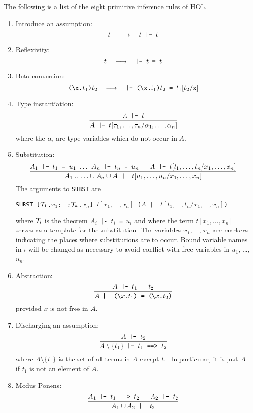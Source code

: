 The following is a list of the eight primitive inference rules of HOL.
\begin{enumerate}
\item Introduce an assumption:
$$ t \quad \longrightarrow \quad \mbox{\tt $t$ |- $t$} $$

\item Reflexivity:
$$ t \quad \longrightarrow \quad \mbox{\tt |- $t$ = $t$}$$

\item Beta-conversion:
$$ \mbox{\tt ({\l}x.$t_1$)$t_2$} \quad \longrightarrow \quad
  \mbox{\tt |- ({\l}x.$t_1$)$t_2$ = $t_1[t_2/{\tt x}]$} $$

\item Type instantiation:
$$\frac{\mbox{\tt $A$ |- $t$}}{\mbox{\tt $A$ |- $t[\tau_1,\ldots,\tau_n/
\alpha_1,\ldots,\alpha_n]$}}$$
where the $\alpha_i$ are type variables which do not occur in $A$.

\item Substitution:
$$\frac{\mbox{\tt $A_1$ |- $t_1$ = $u_1$ $\ldots$ $A_n$ |- $t_n$ = $u_n$ \quad
 $A$ |- $t[t_1,\ldots,t_n/x_1,\ldots,x_n]$}}{\mbox{\tt $A_1\cup\ldots\cup A_n
  \cup A$ |- $t[u_1,\ldots,u_n/x_1,\ldots,x_n]$}}$$
The arguments to {\tt SUBST} are 
\begin{center}\tt SUBST [${\cal T}_1$,$x_1$;$\ldots$;${\cal T}_n$,$x_n$]
 $t[x_1,\ldots,x_n]$ ($A$ |- $t[t_1,\ldots,t_n/x_1,\ldots,x_n]$)
\end{center}
where ${\cal T}_i$ is the theorem {\tt $A_i$ |- $t_i$ = $u_i$} and where the
term $t[x_1,\ldots,x_n]$ serves as a template for the substitution.  The
variables $x_1$, \ldots, $x_n$ are markers indicating the places where
substitutions are to occur.  Bound variable names in $t$ will be changed as
necessary to avoid conflict with free variables in $u_1$, \ldots, $u_n$.

\item Abstraction:
$$\frac{\mbox{\tt $A$ |- $t_1$ = $t_2$}}{\mbox{\tt $A$ |- ({\l}$x$.$t_1$) =
({\l}$x$.$t_2$)}}$$
provided $x$ is not free in $A$.

\item Discharging an assumption:
$$\frac{\mbox{\tt $A$ |- $t_2$}}{\mbox{\tt $A\setminus\{t_1\}$ |- $t_1$ ==>
$t_2$}}$$
where $A\setminus\{t_1\}$ is the set of all terms in $A$ except $t_1$.  In
particular, it is just $A$ if $t_1$ is not an element of $A$.

\item Modus Ponens:
$$\frac{\mbox{\tt $A_1$ |- $t_1$ ==> $t_2$ \quad $A_2$ |- $t_2$}}{\mbox{\tt
 $A_1 \cup A_2$ |- $t_2$}}$$

\end{enumerate}

